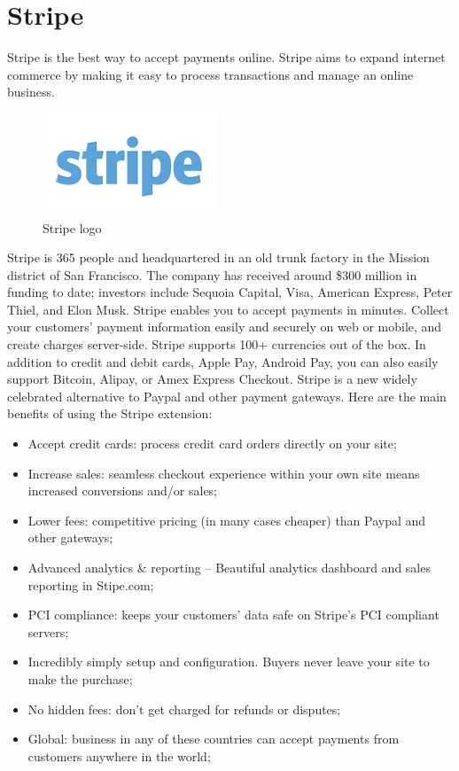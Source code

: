 \section{Stripe}
\label{sec:stripe}
Stripe is the best way to accept payments online. Stripe aims to expand internet commerce by making it easy to process transactions and manage an online business.
\begin{figure}[htb]
\centering
\includegraphics[width=0.5\linewidth]{images/chapter2/stripe-logo.png}\hfill
\caption[Stripe logo]{Stripe logo}
\label{fig:stripe_logo}
\end{figure}
Stripe is 365 people and headquartered in an old trunk factory in the Mission district of San Francisco. The company has received around \$300 million in funding to date; investors include Sequoia Capital, Visa, American Express, Peter Thiel, and Elon Musk. Stripe enables you to accept payments in minutes. Collect your customers’ payment information easily and securely on web or mobile, and create charges server-side. Stripe supports 100+ currencies out of the box. In addition to credit and debit cards, Apple Pay, Android Pay, you can also easily support Bitcoin, Alipay, or Amex Express Checkout.
Stripe is a new widely celebrated alternative to Paypal and other payment gateways. Here are the main benefits of using the Stripe extension:
\begin{itemize}
\item Accept credit cards: process credit card orders directly on your site;
\item Increase sales: seamless checkout experience within your own site means increased conversions and/or sales;
\item Lower fees: competitive pricing (in many cases cheaper) than Paypal and other gateways;
\item Advanced analytics \& reporting – Beautiful analytics dashboard and sales reporting in Stipe.com;
\item PCI compliance: keeps your customers’ data safe on Stripe’s PCI compliant servers;
\item Incredibly simply setup and configuration. Buyers never leave your site to make the purchase;
\item No hidden fees: don’t get charged for refunds or disputes;
\item Global: business in any of these countries can accept payments from customers anywhere in the world;
\end{itemize}

